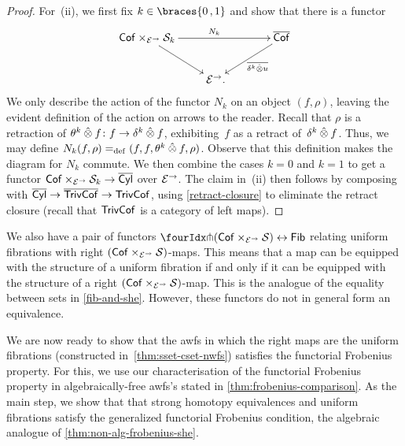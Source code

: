\documentclass[reqno,10pt,a4paper,oneside,draft]{amsart}
\begin{document}
{{\begin{proof}
For~(ii), we first fix $k \in \braces{0\,, 1}$ and show that there is a functor
\begin{equation} \label{lem:from-strong-hequiv}
\begin{gathered}
\xymatrix@!C@C-2em{
  \Cof \times_{\cal{E}^\to} \cal{S}_k
  \ar[dr]
  \ar[rr]^{N_k}
&&
  \overline{\Cof}
  \ar[dl]^-{\overline{\kcyl \hatotimes u}}
\\&
  \catE^\to
\rlap{.}}
\end{gathered}
\end{equation}
We only describe the action of the functor $N_k$ on an object $(f, \rho)$, leaving the evident definition of the action on arrows to the reader.
Recall that $\rho$ is a retraction of $\thetak \hatotimes f \co f \to \kcyl \hatotimes f$, exhibiting~$f$ as a retract of~$\kcyl \hatotimes f$.
Thus, we may define $N_k(f, \rho) \defeq (f, f, \thetak \hatotimes f, \rho)$.
Observe that this definition makes the diagram for $N_k$ commute.
We then combine the cases $k = 0$ and $k = 1$ to get a functor $\Cof \times_{\cal{E}^\to} \cal{S}_k \to \overline{\Cyl}$ over $\cal{E}^\to$.
The claim in~(ii) then follows by composing with $\overline{\Cyl} \to \overline{\TrivCof} \to \TrivCof$, using \cref{retract-closure} to eliminate the retract closure (recall that $\TrivCof$ is a category of left maps).
\end{proof}

\begin{remark} \label{relating-strong-hequiv-and-uniform-fib}
We also have a pair of functors $\liftr{(\Cof \times_{\cal{E}^\to} \cal{S})} \leftrightarrow \Fib$ relating uniform fibrations with right $(\Cof \times_{\cal{E}^\to} \cal{S})$-maps.
This means that a map can be equipped with the structure of a uniform fibration if and only if it can be equipped with the structure of a right $(\Cof \times_{\cal{E}^\to} \cal{S})$-map.
This is the analogue of the equality between sets in \cref{fib-and-she}.
However, these functors do not in general form an equivalence.
\end{remark}

We are now ready to show that the awfs in which the right maps are the uniform fibrations (constructed in~\cref{thm:sset-cset-nwfs}) satisfies the functorial Frobenius property.
For this, we use our characterisation of the functorial Frobenius property in algebraically-free awfs's stated in \cref{thm:frobenius-comparison}.
As the main step, we show that that strong homotopy equivalences and uniform fibrations satisfy the generalized functorial Frobenius condition, \ie the algebraic analogue of \cref{thm:non-alg-frobenius-she}.

}}
\end{document}
